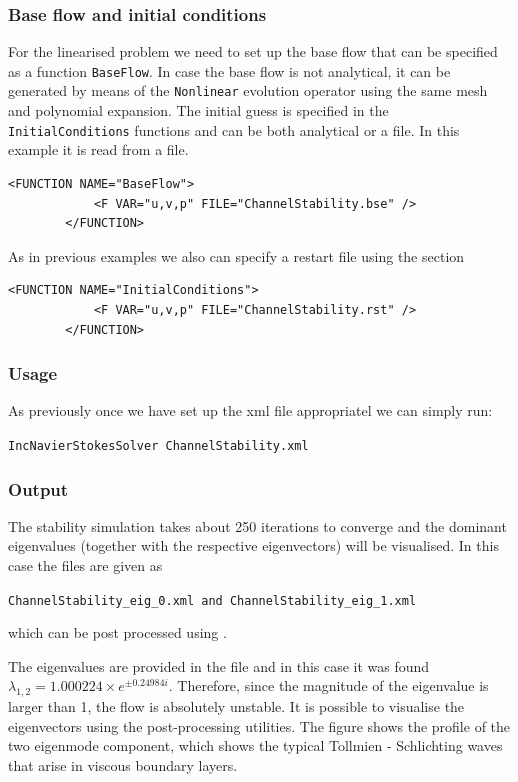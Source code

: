 \subsubsection*{Base flow and initial conditions}

For the linearised problem we need to set up the base flow that can be
specified as a function \texttt{BaseFlow}. In case the base flow is
not analytical, it can be generated by means of the \texttt{Nonlinear}
evolution operator using the same mesh and polynomial expansion. The
initial guess is specified in the \texttt{InitialConditions} functions
and can be both analytical or a file. In this example it is read from
a file.

    \begin{lstlisting}[style=XMLStyle]
        <FUNCTION NAME="BaseFlow">
            <F VAR="u,v,p" FILE="ChannelStability.bse" />
        </FUNCTION>
     \end{lstlisting}

As in previous examples we also can specify a restart file using the
 section
    
    \begin{lstlisting}[style=XMLStyle]
        <FUNCTION NAME="InitialConditions">
            <F VAR="u,v,p" FILE="ChannelStability.rst" />
        </FUNCTION>
     \end{lstlisting}

\subsubsection*{Usage}

As previously once we have set up the xml file appropriatel we can simply run:

\texttt{IncNavierStokesSolver ChannelStability.xml}


\subsubsection*{Output}

The stability simulation takes about 250 iterations to converge and
the dominant eigenvalues (together with the respective eigenvectors)
will be visualised. In this case the files are given as

\texttt{ChannelStability\_eig\_0.xml and ChannelStability\_eig\_1.xml}

which can be post processed using .

The eigenvalues are provided in the file 
and in this case it was found $ \lambda_{1,2}=1.000224 \times e^{\pm
  0.24984i}$. Therefore, since the magnitude of the eigenvalue is
larger than 1, the flow is absolutely unstable. It is possible to
visualise the eigenvectors using the post-processing utilities. The
figure shows the profile of the two eigenmode component, which shows
the typical Tollmien - Schlichting waves that arise in viscous
boundary layers.

